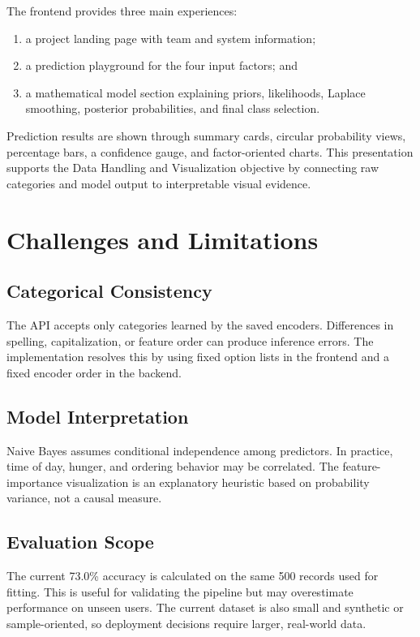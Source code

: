\documentclass[conference]{IEEEtran}
\begin{document}
The frontend provides three main experiences:
\begin{enumerate}
    \item a project landing page with team and system information;
    \item a prediction playground for the four input factors; and
    \item a mathematical model section explaining priors, likelihoods, Laplace smoothing, posterior probabilities, and final class selection.
\end{enumerate}

Prediction results are shown through summary cards, circular probability views, percentage bars, a confidence gauge, and factor-oriented charts. This presentation supports the Data Handling and Visualization objective by connecting raw categories and model output to interpretable visual evidence.

\section{Challenges and Limitations}

\subsection{Categorical Consistency}

The API accepts only categories learned by the saved encoders. Differences in spelling, capitalization, or feature order can produce inference errors. The implementation resolves this by using fixed option lists in the frontend and a fixed encoder order in the backend.

\subsection{Model Interpretation}

Naive Bayes assumes conditional independence among predictors. In practice, time of day, hunger, and ordering behavior may be correlated. The feature-importance visualization is an explanatory heuristic based on probability variance, not a causal measure.

\subsection{Evaluation Scope}

The current 73.0\% accuracy is calculated on the same 500 records used for fitting. This is useful for validating the pipeline but may overestimate performance on unseen users. The current dataset is also small and synthetic or sample-oriented, so deployment decisions require larger, real-world data.
\end{document}
